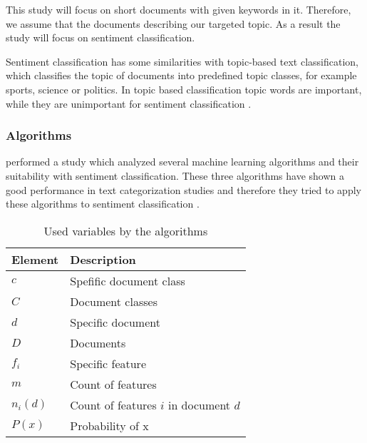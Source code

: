 This study will focus on short documents with given keywords in it. 
Therefore, we assume that the documents describing our targeted topic.
As a result the study will focus on sentiment classification.

Sentiment classification has some similarities with topic-based text classification, which classifies the topic of documents into predefined topic classes, for example sports, science or politics.
In topic based classification topic words are important, while they are unimportant for sentiment classification \cite[page 412f]{Liu2007}.

\subsubsection{Algorithms}
\label{sss:background-optionmining-alogrithms}

\citeauthor{Pang2002} performed a study which analyzed several machine learning algorithms and their suitability with sentiment classification.
These three algorithms have shown a good performance in text categorization studies and therefore they tried to apply these algorithms to sentiment classification \cite{Pang2002}.

\begin{table}
	\begin{center}
		\begin{tabular}{l l}
			\textbf{Element} & \textbf{Description} \\ \hline
			$c$ & Spefific document class \\
			$C$ & Document classes \\
			$d$ & Specific document \\
			$D$ & Documents \\
			$f_i$ & Specific feature \\
			$m$ & Count of features \\
			$n_i(d)$ & Count of features $i$ in document $d$ \\
			$P(x)$ & Probability of x \\
		\end{tabular}
	
		\label{tab:background-optionmining-algorithms-variables}
		\caption{Used variables by the algorithms}		
	\end{center}
\end{table}

